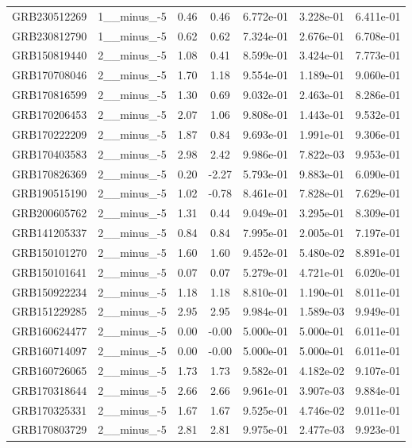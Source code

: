 \documentclass[12pt]{article}
\begin{document}
\begin{table}[h!]
{\begin{tabular}{l c c c c c c}
GRB230512269 & 1__minus_-5 & 0.46 & 0.46 & 6.772e-01 & 3.228e-01 & 6.411e-01 \\
GRB230812790 & 1__minus_-5 & 0.62 & 0.62 & 7.324e-01 & 2.676e-01 & 6.708e-01 \\
GRB150819440 & 2__minus_-5 & 1.08 & 0.41 & 8.599e-01 & 3.424e-01 & 7.773e-01 \\
GRB170708046 & 2__minus_-5 & 1.70 & 1.18 & 9.554e-01 & 1.189e-01 & 9.060e-01 \\
GRB170816599 & 2__minus_-5 & 1.30 & 0.69 & 9.032e-01 & 2.463e-01 & 8.286e-01 \\
GRB170206453 & 2__minus_-5 & 2.07 & 1.06 & 9.808e-01 & 1.443e-01 & 9.532e-01 \\
GRB170222209 & 2__minus_-5 & 1.87 & 0.84 & 9.693e-01 & 1.991e-01 & 9.306e-01 \\
GRB170403583 & 2__minus_-5 & 2.98 & 2.42 & 9.986e-01 & 7.822e-03 & 9.953e-01 \\
GRB170826369 & 2__minus_-5 & 0.20 & -2.27 & 5.793e-01 & 9.883e-01 & 6.090e-01 \\
GRB190515190 & 2__minus_-5 & 1.02 & -0.78 & 8.461e-01 & 7.828e-01 & 7.629e-01 \\
GRB200605762 & 2__minus_-5 & 1.31 & 0.44 & 9.049e-01 & 3.295e-01 & 8.309e-01 \\
GRB141205337 & 2__minus_-5 & 0.84 & 0.84 & 7.995e-01 & 2.005e-01 & 7.197e-01 \\
GRB150101270 & 2__minus_-5 & 1.60 & 1.60 & 9.452e-01 & 5.480e-02 & 8.891e-01 \\
GRB150101641 & 2__minus_-5 & 0.07 & 0.07 & 5.279e-01 & 4.721e-01 & 6.020e-01 \\
GRB150922234 & 2__minus_-5 & 1.18 & 1.18 & 8.810e-01 & 1.190e-01 & 8.011e-01 \\
GRB151229285 & 2__minus_-5 & 2.95 & 2.95 & 9.984e-01 & 1.589e-03 & 9.949e-01 \\
GRB160624477 & 2__minus_-5 & 0.00 & -0.00 & 5.000e-01 & 5.000e-01 & 6.011e-01 \\
GRB160714097 & 2__minus_-5 & 0.00 & -0.00 & 5.000e-01 & 5.000e-01 & 6.011e-01 \\
GRB160726065 & 2__minus_-5 & 1.73 & 1.73 & 9.582e-01 & 4.182e-02 & 9.107e-01 \\
GRB170318644 & 2__minus_-5 & 2.66 & 2.66 & 9.961e-01 & 3.907e-03 & 9.884e-01 \\
GRB170325331 & 2__minus_-5 & 1.67 & 1.67 & 9.525e-01 & 4.746e-02 & 9.011e-01 \\
GRB170803729 & 2__minus_-5 & 2.81 & 2.81 & 9.975e-01 & 2.477e-03 & 9.923e-01 \\

\end{tabular}}
\end{table}
\end{document}
